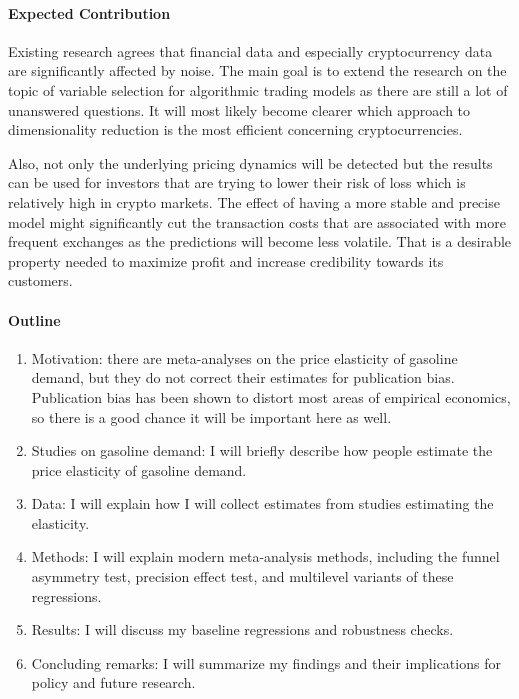 \paragraph{Expected Contribution}

Existing research agrees that financial data and especially cryptocurrency data are significantly affected by noise. The main
goal is to extend the research on the topic of variable selection for algorithmic trading models as there are still a lot of
unanswered questions. It will most likely become clearer which approach to dimensionality reduction is the most efficient
concerning cryptocurrencies.

Also, not only the underlying pricing dynamics will be detected but the results can be used for investors that are trying to
lower their risk of loss which is relatively high in crypto markets. The effect of having a more stable and precise model
might significantly cut the transaction costs that are associated with more frequent exchanges as the predictions will become
less volatile. That is a desirable property needed to maximize profit and increase credibility towards its customers.

\paragraph{Outline}
\begin{enumerate}
	\item Motivation: there are meta-analyses on the price elasticity of gasoline demand, but they do not correct their estimates for publication bias. Publication bias has been shown to distort most areas of empirical economics, so there is a good chance it will be important here as well.
	\item Studies on gasoline demand: I will briefly describe how people estimate the price elasticity of gasoline demand.
	\item Data: I will explain how I will collect estimates from studies estimating the elasticity.
	\item Methods: I will explain modern meta-analysis methods, including the funnel asymmetry test, precision effect test, and multilevel variants of these regressions.
	\item Results: I will discuss my baseline regressions and robustness checks.
	\item Concluding remarks: I will summarize my findings and their implications for policy and future research.
\end{enumerate}


